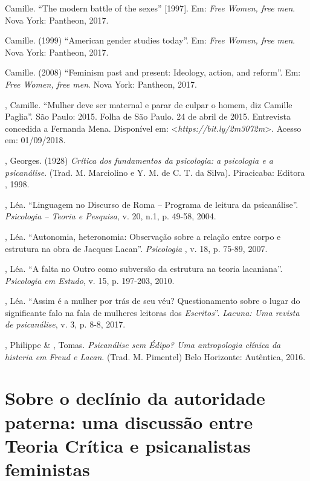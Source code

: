  Camille. ``The modern battle of the sexes'' {[}1997{]}. Em:
\emph{Free Women, free men}. Nova York: Pantheon, 2017.

 Camille. (1999) ``American gender studies today''. Em: \emph{Free
Women, free men}. Nova York: Pantheon, 2017.

 Camille. (2008) ``Feminism past and present: Ideology, action,
and reform''. Em: \emph{Free Women, free men}. Nova York: Pantheon,
2017.

, Camille. ``Mulher deve ser maternal e parar de culpar o homem,
diz Camille Paglia''. São Paulo: 2015. Folha de São Paulo. 24 de abril
de 2015. Entrevista concedida a Fernanda Mena. Disponível em:
\textless{}\emph{https://bit.ly/2m3072m}\textgreater{}.
Acesso em: 01/09/2018.

, Georges. (1928) \emph{Crítica dos fundamentos da psicologia: a
psicologia e a psicanálise}. (Trad. M. Marciolino e Y. M. de C. T. da
Silva). Piracicaba: Editora , 1998.

, Léa. ``Linguagem no Discurso de Roma -- Programa de leitura da
psicanálise''. \emph{Psicologia -- Teoria e Pesquisa}, v. 20, n.1, p.
49-58, 2004.

, Léa. ``Autonomia, heteronomia: Observação sobre a relação
entre corpo e estrutura na obra de Jacques Lacan''. \emph{Psicologia
}, v. 18, p. 75-89, 2007.

, Léa. ``A falta no Outro como subversão da estrutura na teoria
lacaniana''. \emph{Psicologia em Estudo}, v. 15, p. 197-203, 2010.

, Léa. ``Assim é a mulher por trás de seu véu? Questionamento
sobre o lugar do significante falo na fala de mulheres leitoras dos
\emph{Escritos}''. \emph{Lacuna: Uma revista de psicanálise}, v. 3, p.
8-8, 2017.

, Philippe \& , Tomas. \emph{Psicanálise sem Édipo? Uma
antropologia clínica da histeria em Freud e Lacan}. (Trad. M. Pimentel)
Belo Horizonte: Autêntica, 2016.

\chapter*{Sobre o declínio da autoridade paterna: uma discussão entre
Teoria Crítica e psicanalistas feministas}


